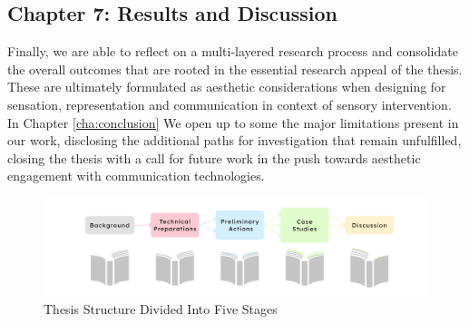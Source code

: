 \subsection{Chapter 7: Results and Discussion}

Finally, we are able to reflect on a multi-layered research process and consolidate the overall outcomes that are rooted in the essential research appeal of the thesis. These are ultimately formulated as aesthetic considerations when designing for sensation, representation and communication in context of sensory intervention. In Chapter \ref{cha:conclusion} We open up to some the major limitations present in our work, disclosing the additional paths for investigation that remain unfulfilled, closing the thesis with a call for future work in the push towards aesthetic engagement with communication technologies.

\begin{figure}[htbp]
	\centering
	\includegraphics[width=1.0\textwidth]{Chapters/Figures/background/Sec1_Thesis_Structure}
	\caption{Thesis Structure Divided Into Five Stages}
	\label{fig:thesis_structure}
\end{figure}

